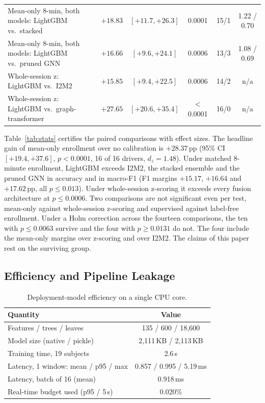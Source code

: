 \documentclass[journal]{IEEEtran}
\newcommand{\pp}{\,pp}
\begin{document}
\begin{table}[!t]
\begin{tabular}{@{}lccccc@{}}
Mean-only 8-min, both models: LightGBM vs.\ stacked & $+18.83$ & $[+11.7,+26.3]$ & 0.0001 & 15/1 & 1.22 / 0.70 \\
Mean-only 8-min, both models: LightGBM vs.\ pruned GNN & $+16.66$ & $[+9.6,+24.1]$ & 0.0006 & 13/3 & 1.08 / 0.69 \\
Whole-session z: LightGBM vs.\ I2M2            & $+15.85$ & $[+9.4,+22.5]$  & 0.0006 & 14/2 & n/a \\
Whole-session z: LightGBM vs.\ graph-transformer & $+27.65$ & $[+20.6,+35.4]$ & $<$0.0001 & 16/0 & n/a \\
\bottomrule
\end{tabular}
\end{table}

Table~\ref{tab:stats} certifies the paired comparisons with effect sizes. The
headline gain of mean-only enrollment over no calibration is $+28.37$\pp{}
(95\% CI $[+19.4,+37.6]$, $p<0.0001$, 16 of 16 drivers, $d_z=1.48$). Under
matched 8-minute enrollment, LightGBM exceeds I2M2, the stacked ensemble and
the pruned GNN in accuracy and in macro-F1 (F1 margins $+15.17$, $+16.64$ and
$+17.62$\pp, all $p\le0.013$). Under whole-session z-scoring it exceeds every
fusion architecture at $p\le0.0006$. Two comparisons are not significant even
per test, mean-only against whole-session z-scoring and supervised against
label-free enrollment. Under a Holm correction across the fourteen
comparisons, the ten with $p\le0.0063$ survive and the four with
$p\ge0.0131$ do not. The four include the mean-only margins over z-scoring and
over I2M2. The claims of this paper rest on the surviving group.

\subsection{Efficiency and Pipeline Leakage}
\label{sec:efficiency}\label{sec:leakage}
\begin{table}[!t]
\caption{Deployment-model efficiency on a single CPU core.}
\label{tab:eff}
\centering\footnotesize
\begin{tabular}{@{}lc@{}}
\toprule
Quantity & Value \\
\midrule
Features / trees / leaves                & 135 / 600 / 18{,}600 \\
Model size (native / pickle)             & 2{,}111\,KB / 2{,}113\,KB \\
Training time, 19 subjects               & 2.6\,s \\
Latency, 1 window: mean / p95 / max      & 0.857 / 0.995 / 5.19\,ms \\
Latency, batch of 16 (mean)              & 0.918\,ms \\
Real-time budget used (p95 / 5\,s)       & 0.020\% \\
\bottomrule
\end{tabular}
\end{table}
\end{document}
